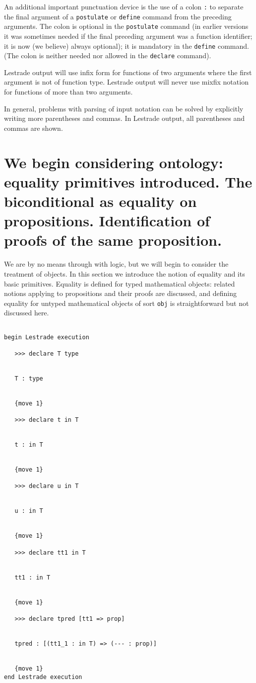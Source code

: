 \documentclass[12pt]{article}
\begin{document}
An additional important punctuation device is the use of a colon {\tt :} to separate the final argument of a {\tt postulate} or {\tt define} command from the preceding arguments.  The colon is optional in the {\tt postulate} command (in earlier versions it was sometimes needed if the final preceding argument was a function identifier; it is now (we believe) always optional); it is mandatory in the {\tt define} command.  (The colon is neither needed nor allowed in the {\tt declare} command).

Lestrade output will use infix form for functions of two arguments where the first argument is not of function type.  Lestrade output will never use mixfix notation for functions of more than two arguments.

In general, problems with parsing of input notation can be solved by explicitly writing more parentheses and commas.  In Lestrade  output, all parentheses and commas are shown.

\section{We begin considering ontology:  equality primitives introduced.  The biconditional as equality on propositions.  Identification of proofs of the same proposition.}

We are by no means through with logic, but we will begin to consider the treatment of objects.  In this section we introduce the notion of equality and its basic primitives.  Equality is defined for typed mathematical objects:  related notions applying to propositions and their proofs are discussed, and defining equality for untyped mathematical objects of sort {\tt obj} is straightforward but not discussed here.

\begin{verbatim}

begin Lestrade execution

   >>> declare T type


   T : type


   {move 1}

   >>> declare t in T


   t : in T


   {move 1}

   >>> declare u in T


   u : in T


   {move 1}

   >>> declare tt1 in T


   tt1 : in T


   {move 1}

   >>> declare tpred [tt1 => prop]


   tpred : [(tt1_1 : in T) => (--- : prop)]


   {move 1}
end Lestrade execution
\end{verbatim}
\end{document}
